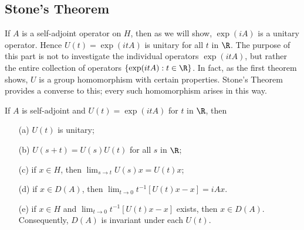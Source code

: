 \subsection{Stone's Theorem}
If $A$ is a self-adjoint operator on $H$, then as we will show, $\exp(iA)$ is a unitary operator. Hence $U(t)=\exp(itA)$ is unitary for all $t$ in $\R$. The purpose of this part is not to investigate the individual operators $\exp(itA)$, but rather the entire collection of operators $\{\exp(itA):t\in\R\}$. In fact, as the first theorem shows, $U$ is a group homomorphism with certain properties. Stone's Theorem provides a converse to this; every such homomorphism arises in this way.
\begin{theorem}\label{Hilbert space self-adjoint exp(itA)}
If $A$ is self-adjoint and $U(t)=\exp(itA)$ for $t$ in $\R$, then
\begin{itemize}
\item[(a)] $U(t)$ is unitary;
\item[(b)] $U(s+t)=U(s)U(t)$ for all $s$ in $\R$;
\item[(c)] if $x\in H$, then $\lim_{s\to t}U(s)x=U(t)x$;
\item[(d)] if $x\in D(A)$, then $\lim_{t\to 0}t^{-1}[U(t)x-x]=iAx$.
\item[(e)] if $x\in H$ and $\lim_{t\to 0}t^{-1}[U(t)x-x]$ exists, then $x\in D(A)$. Consequently, $D(A)$ is invariant under each $U(t)$.
\end{itemize}
\end{theorem}
